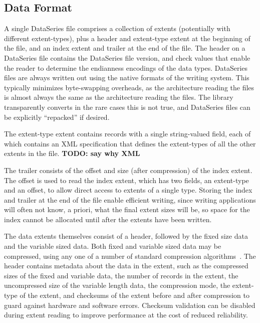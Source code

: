 \documentclass{acm_proc_article-sp}
\begin{document}
\subsection{Data Format}

A single DataSeries file comprises a collection of extents
(potentially with different extent-types), plus a header and
extent-type extent at the beginning of the file, and an index extent
and trailer at the end of the file. The header on a DataSeries file 
contains the DataSeries
file version, and check values that enable the reader to determine the
endianness encodings of the data types.  DataSeries files are always
written out using the native formats of the writing system. This 
typically minimizes byte-swapping overheads, as the architecture 
reading the files is almost always the same as the architecture reading
the files. The library transparently converts in the rare cases this
is not true, and DataSeries files can be explicitly ``repacked'' if desired. 

The
extent-type extent contains records with a single string-valued field,
each of which contains an XML specification that defines the
extent-types of all the other extents in the file. 
{\bf TODO: say why XML}

The trailer
consists of the offset and size (after compression) of the index
extent.  The offset is used to read the index extent, which has two
fields, an extent-type and an offset, to allow direct access to
extents of a single type. Storing the index and trailer at the end
of the file enable efficient writing, since writing applications will
often not know, a priori, what the final extent sizes will be, so space 
for the index cannot be allocated until after the extents have been written.

The data extents themselves consist of a header, followed by the fixed
size data and the variable sized data.  Both fixed and variable sized
data may be compressed, using any one of a number of standard
compression algorithms~\cite{GZIP,BZIP,LZF,LZO}.  The header contains
metadata about the data in the extent, such as the compressed sizes of
the fixed and variable data, the number of records in the extent, the
uncompressed size of the variable length data, the compression mode,
the extent-type of the extent, and checksums of the extent before and
after compression to guard against hardware and software errors.
Checksum validation can be disabled during extent reading to improve
performance at the cost of reduced reliability.
\end{document}
